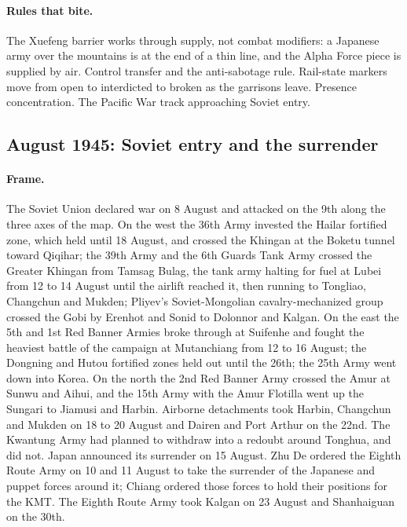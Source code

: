 \documentclass[11pt]{article}
\begin{document}
\paragraph{Rules that bite.} The Xuefeng barrier works through supply, not combat modifiers: a Japanese army over the mountains is at the end of a thin line, and the Alpha Force piece is supplied by air. Control transfer and the anti-sabotage rule. Rail-state markers move from open to interdicted to broken as the garrisons leave. Presence concentration. The Pacific War track approaching Soviet entry.
\clearpage

\subsection{August 1945: Soviet entry and the surrender}
\paragraph{Frame.} The Soviet Union declared war on 8 August and attacked on the 9th along the three axes of the map. On the west the 36th Army invested the Hailar fortified zone, which held until 18 August, and crossed the Khingan at the Boketu tunnel toward Qiqihar; the 39th Army and the 6th Guards Tank Army crossed the Greater Khingan from Tamsag Bulag, the tank army halting for fuel at Lubei from 12 to 14 August until the airlift reached it, then running to Tongliao, Changchun and Mukden; Pliyev's Soviet-Mongolian cavalry-mechanized group crossed the Gobi by Erenhot and Sonid to Dolonnor and Kalgan. On the east the 5th and 1st Red Banner Armies broke through at Suifenhe and fought the heaviest battle of the campaign at Mutanchiang from 12 to 16 August; the Dongning and Hutou fortified zones held out until the 26th; the 25th Army went down into Korea. On the north the 2nd Red Banner Army crossed the Amur at Sunwu and Aihui, and the 15th Army with the Amur Flotilla went up the Sungari to Jiamusi and Harbin. Airborne detachments took Harbin, Changchun and Mukden on 18 to 20 August and Dairen and Port Arthur on the 22nd. The Kwantung Army had planned to withdraw into a redoubt around Tonghua, and did not. Japan announced its surrender on 15 August. Zhu De ordered the Eighth Route Army on 10 and 11 August to take the surrender of the Japanese and puppet forces around it; Chiang ordered those forces to hold their positions for the KMT. The Eighth Route Army took Kalgan on 23 August and Shanhaiguan on the 30th.
\end{document}
